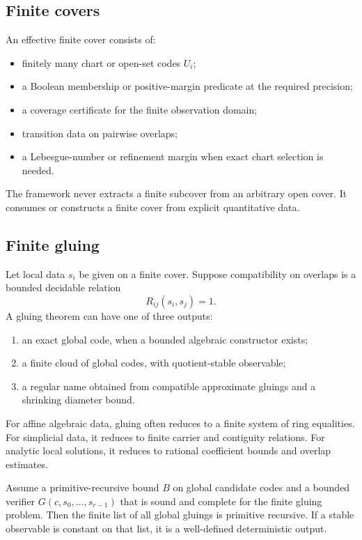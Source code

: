\subsection{Finite covers}

An effective finite cover consists of:
\begin{itemize}
\item finitely many chart or open-set codes \(U_i\);
\item a Boolean membership or positive-margin predicate at the required
precision;
\item a coverage certificate for the finite observation domain;
\item transition data on pairwise overlaps;
\item a Lebesgue-number or refinement margin when exact chart selection is
needed.
\end{itemize}
The framework never extracts a finite subcover from an arbitrary open cover.
It consumes or constructs a finite cover from explicit quantitative data.

\subsection{Finite gluing}

Let local data \(s_i\) be given on a finite cover.  Suppose compatibility on
overlaps is a bounded decidable relation
\[
       R_{ij}(s_i,s_j)=1.
\]
A gluing theorem can have one of three outputs:
\begin{enumerate}
\item an exact global code, when a bounded algebraic constructor exists;
\item a finite cloud of global codes, with quotient-stable observable;
\item a regular name obtained from compatible approximate gluings and a
shrinking diameter bound.
\end{enumerate}

For affine algebraic data, gluing often reduces to a finite system of ring
equalities.  For simplicial data, it reduces to finite carrier and contiguity
relations.  For analytic local solutions, it reduces to rational coefficient
bounds and overlap estimates.

\begin{theorem}
Assume a primitive-recursive bound \(B\) on global candidate codes and a
bounded verifier \(G(c,s_0,\ldots,s_{r-1})\) that is sound and complete for the
finite gluing problem.  Then the finite list of all global gluings is primitive
recursive.  If a stable observable is constant on that list, it is a
well-defined deterministic output.
\end{theorem}

